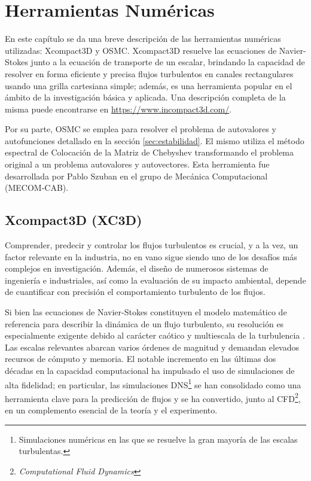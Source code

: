 \chapter{Herramientas Numéricas} \label{cap:numerico}

En este capítulo se da una breve descripción de las herramientas numéricas utilizadas: Xcompact3D y OSMC. Xcompact3D resuelve las ecuaciones de Navier-Stokes junto a la ecuación de transporte de un escalar, brindando la capacidad de resolver en forma eficiente y precisa flujos turbulentos en canales rectangulares usando una grilla cartesiana simple; además, es una herramienta popular en el ámbito de la investigación básica y aplicada. Una descripción completa de la misma puede encontrarse en \url{https://www.incompact3d.com/}.

Por su parte, OSMC se emplea para resolver el problema de autovalores y autofunciones detallado en la sección \ref{sec:estabilidad}. El mismo utiliza el método espectral de Colocación de la Matriz de Chebyshev transformando el problema original a un problema autovalores y autovectores. Esta herramienta fue desarrollada por Pablo Szuban \cite{szuban2023} en el grupo de Mecánica Computacional (MECOM-CAB). 


\section{Xcompact3D (XC3D)}

Comprender, predecir y controlar los flujos turbulentos es crucial, y a la vez, un factor relevante en la industria, no en vano sigue siendo uno de los desafíos más complejos en investigación. Además, el diseño de numerosos sistemas de ingeniería e industriales, así como la evaluación de su impacto ambiental, depende de cuantificar con precisión el comportamiento turbulento de los flujos.

Si bien las ecuaciones de Navier-Stokes constituyen el modelo matemático de referencia para describir la dinámica de un flujo turbulento, su resolución es especialmente exigente debido al carácter caótico y multiescala de la turbulencia \cite{pope2001turbulent}. Las escalas relevantes abarcan varios órdenes de magnitud y demandan elevados recursos de cómputo y memoria. El notable incremento en las últimas dos décadas en la capacidad computacional ha impulsado el uso de simulaciones de alta fidelidad; en particular, las simulaciones DNS\footnote{Simulaciones numéricas en las que se resuelve la gran mayoría de las escalas turbulentas.} se han consolidado como una herramienta clave para la predicción de flujos y se ha convertido, junto al CFD\footnote{\textit{Computational Fluid Dynamics}}, en un complemento esencial de la teoría y el experimento.

